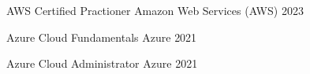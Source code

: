 

\begin{cvhonors}

  \cvhonor
    {AWS Certified Practioner} %
    {Amazon Web Services (AWS)} %
    {} %
    {2023} %


  \cvhonor
    {Azure Cloud Fundamentals} %
    {Azure} %
    {} %
    {2021} %

  \cvhonor
    {Azure Cloud Administrator} %
    {Azure} %
    {} %
    {2021} %
\end{cvhonors}
